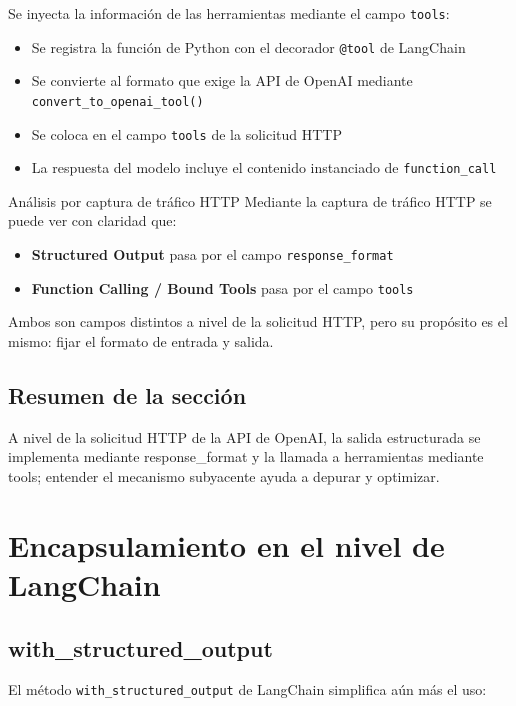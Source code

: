 \documentclass[a4paper]{article}
\begin{document}
Se inyecta la información de las herramientas mediante el campo \texttt{tools}:

\begin{itemize}
    \item Se registra la función de Python con el decorador \texttt{@tool} de LangChain
    \item Se convierte al formato que exige la API de OpenAI mediante \texttt{convert\_to\_openai\_tool()}
    \item Se coloca en el campo \texttt{tools} de la solicitud HTTP
    \item La respuesta del modelo incluye el contenido instanciado de \texttt{function\_call}
\end{itemize}

\begin{knowledgebox}{Análisis por captura de tráfico HTTP}
Mediante la captura de tráfico HTTP se puede ver con claridad que:
\begin{itemize}
    \item \textbf{Structured Output} pasa por el campo \texttt{response\_format}
    \item \textbf{Function Calling / Bound Tools} pasa por el campo \texttt{tools}
\end{itemize}
Ambos son campos distintos a nivel de la solicitud HTTP, pero su propósito es el mismo: fijar el formato de entrada y salida.
\end{knowledgebox}

\subsection{Resumen de la sección}

A nivel de la solicitud HTTP de la API de OpenAI, la salida estructurada se implementa mediante response\_format y la llamada a herramientas mediante tools; entender el mecanismo subyacente ayuda a depurar y optimizar.

\section{Encapsulamiento en el nivel de LangChain}

\subsection{with\_structured\_output}

El método \texttt{with\_structured\_output} de LangChain simplifica aún más el uso:
\end{document}
